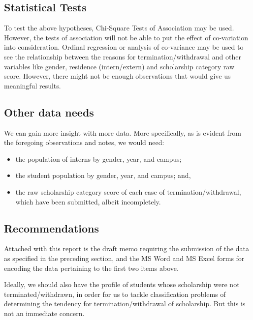 \documentclass[a4paper]{article}
\providecommand{\tightlist}{%
  \setlength{\itemsep}{0pt}\setlength{\parskip}{0pt}}
\begin{document}
\hypertarget{statistical-tests}{%
\subsection{Statistical Tests}\label{statistical-tests}}

To test the above hypotheses, Chi-Square Tests of Association may be
used. However, the tests of association will not be able to put the
effect of co-variation into consideration. Ordinal regression or
analysis of co-variance may be used to see the relationship between the
reasons for termination/withdrawal and other variables like gender,
residence (intern/extern) and scholarship category raw score. However,
there might not be enough observations that would give us meaningful
results.

\hypertarget{other-data-needs}{%
\subsection{Other data needs}\label{other-data-needs}}

We can gain more insight with more data. More specifically, as is
evident from the foregoing observations and notes, we would need:

\begin{itemize}
\tightlist
\item
  the population of interns by gender, year, and campus;
\item
  the student population by gender, year, and campus; and,
\item
  the raw scholarship category score of each case of
  termination/withdrawal, which have been submitted, albeit
  incompletely.
\end{itemize}

\hypertarget{recommendations}{%
\subsection{Recommendations}\label{recommendations}}

Attached with this report is the draft memo requiring the submission of
the data as specified in the preceding section, and the MS Word and MS
Excel forms for encoding the data pertaining to the first two items
above.

Ideally, we should also have the profile of students whose scholarship
were not terminated/withdrawn, in order for us to tackle classification
problems of determining the tendency for termination/withdrawal of
scholarship. But this is not an immediate concern.
\end{document}
